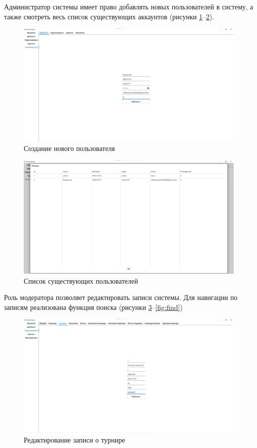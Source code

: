 Администратор системы имеет право добавлять новых пользователей в систему, а также смотреть весь список существующих аккаунтов (рисунки \ref{fig:user_create}--\ref{fig:users}).


\begin{figure}[h!btp]
	\centering
	\includegraphics[scale = 0.3]{inc/img/user_create.png}
	\caption{Создание нового пользователя}
	\label{fig:user_create}	
\end{figure}


\clearpage

\begin{figure}[h!btp]
	\centering
	\includegraphics[scale = 0.3]{inc/img/users.png}
	\caption{Список существующих пользователей}
	\label{fig:users}	
\end{figure}

Роль модератора позволяет редактировать записи системы. Для навигации по записям реализована функция поиска (рисунки \ref{fig:edit}--\ref{fig:find})

\begin{figure}[h!btp]
	\centering
	\includegraphics[scale = 0.3]{inc/img/edit.png}
	\caption{Редактирование записи о турнире}
	\label{fig:edit}	
\end{figure}

